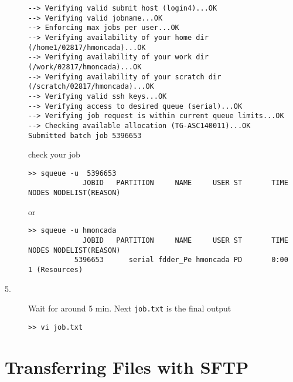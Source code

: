 \documentclass{article}
\begin{document}
\begin{description}
\begin{scriptsize}
\begin{verbatim}
--> Verifying valid submit host (login4)...OK
--> Verifying valid jobname...OK
--> Enforcing max jobs per user...OK
--> Verifying availability of your home dir (/home1/02817/hmoncada)...OK
--> Verifying availability of your work dir (/work/02817/hmoncada)...OK
--> Verifying availability of your scratch dir (/scratch/02817/hmoncada)...OK
--> Verifying valid ssh keys...OK
--> Verifying access to desired queue (serial)...OK
--> Verifying job request is within current queue limits...OK
--> Checking available allocation (TG-ASC140011)...OK
Submitted batch job 5396653
\end{verbatim}\end{scriptsize}
check your job
\begin{scriptsize}\begin{verbatim}
>> squeue -u  5396653
             JOBID   PARTITION     NAME     USER ST       TIME  NODES NODELIST(REASON)
\end{verbatim}\end{scriptsize}
or
\begin{scriptsize}\begin{verbatim}
>> squeue -u hmoncada
             JOBID   PARTITION     NAME     USER ST       TIME  NODES NODELIST(REASON)
           5396653      serial fdder_Pe hmoncada PD       0:00      1 (Resources)
\end{verbatim}\end{scriptsize}          

\item [5.] Wait for around 5 min. Next \verb+job.txt+ is the final output 
\begin{scriptsize}\begin{verbatim}
>> vi job.txt
\end{verbatim}\end{scriptsize}
\end{description}
\section{Transferring Files with SFTP}
\end{document}
